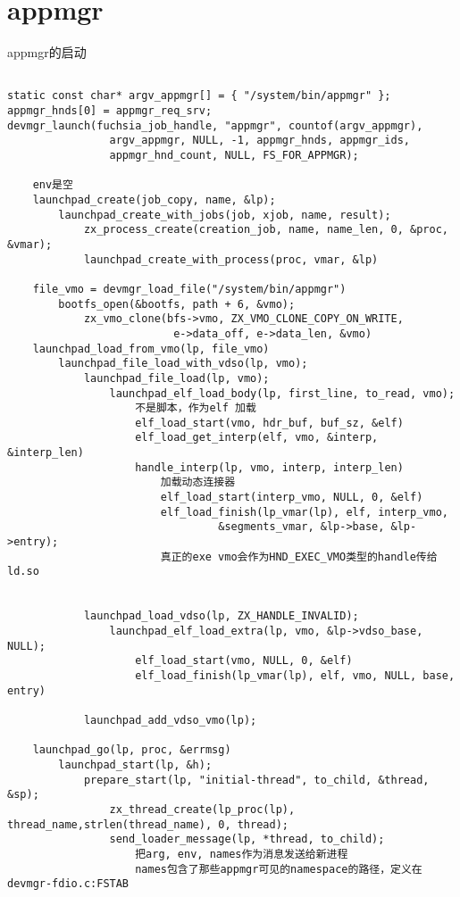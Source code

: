 \section{appmgr}

appmgr的启动

\begin{verbatim}

static const char* argv_appmgr[] = { "/system/bin/appmgr" };
appmgr_hnds[0] = appmgr_req_srv;
devmgr_launch(fuchsia_job_handle, "appmgr", countof(argv_appmgr),
                argv_appmgr, NULL, -1, appmgr_hnds, appmgr_ids,
                appmgr_hnd_count, NULL, FS_FOR_APPMGR);

    env是空
    launchpad_create(job_copy, name, &lp);
        launchpad_create_with_jobs(job, xjob, name, result);
            zx_process_create(creation_job, name, name_len, 0, &proc, &vmar);
            launchpad_create_with_process(proc, vmar, &lp)
    
    file_vmo = devmgr_load_file("/system/bin/appmgr")
        bootfs_open(&bootfs, path + 6, &vmo);
            zx_vmo_clone(bfs->vmo, ZX_VMO_CLONE_COPY_ON_WRITE,
                          e->data_off, e->data_len, &vmo)
    launchpad_load_from_vmo(lp, file_vmo)
        launchpad_file_load_with_vdso(lp, vmo);
            launchpad_file_load(lp, vmo);
                launchpad_elf_load_body(lp, first_line, to_read, vmo);
                    不是脚本，作为elf 加载
                    elf_load_start(vmo, hdr_buf, buf_sz, &elf)
                    elf_load_get_interp(elf, vmo, &interp, &interp_len)
                    handle_interp(lp, vmo, interp, interp_len)
                        加载动态连接器
                        elf_load_start(interp_vmo, NULL, 0, &elf)
                        elf_load_finish(lp_vmar(lp), elf, interp_vmo,
                                 &segments_vmar, &lp->base, &lp->entry);
                        真正的exe vmo会作为HND_EXEC_VMO类型的handle传给ld.so


            launchpad_load_vdso(lp, ZX_HANDLE_INVALID);
                launchpad_elf_load_extra(lp, vmo, &lp->vdso_base, NULL);
                    elf_load_start(vmo, NULL, 0, &elf)
                    elf_load_finish(lp_vmar(lp), elf, vmo, NULL, base, entry)

            launchpad_add_vdso_vmo(lp);

    launchpad_go(lp, proc, &errmsg)
        launchpad_start(lp, &h);
            prepare_start(lp, "initial-thread", to_child, &thread, &sp);
                zx_thread_create(lp_proc(lp), thread_name,strlen(thread_name), 0, thread);
                send_loader_message(lp, *thread, to_child);
                    把arg, env, names作为消息发送给新进程
                    names包含了那些appmgr可见的namespace的路径，定义在devmgr-fdio.c:FSTAB
                

\end{verbatim}
